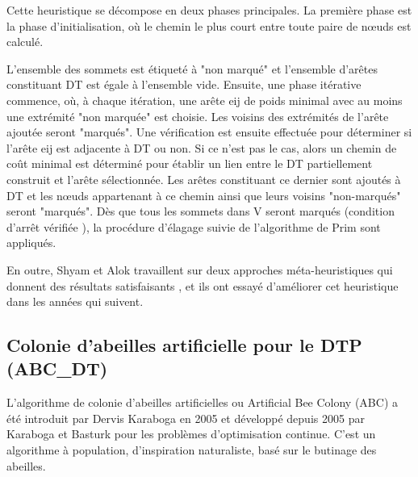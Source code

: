 Cette heuristique se décompose en deux phases principales. La première phase est la phase d’initialisation, où le chemin le plus court entre toute paire de nœuds est calculé.

L’ensemble des sommets est étiqueté à "non marqué" et l’ensemble d’arêtes constituant DT est égale à l’ensemble vide. Ensuite, une phase itérative commence, où, à chaque itération, une arête eij de poids minimal avec au moins une extrémité "non marquée" est choisie. Les voisins des extrémités de l’arête ajoutée seront "marqués". Une vérification est ensuite effectuée pour déterminer si l’arête eij est adjacente à DT ou non. Si ce n’est pas le cas, alors un chemin de coût minimal est déterminé pour établir un lien entre le DT partiellement construit et l’arête sélectionnée. Les arêtes constituant ce dernier sont ajoutés à DT et les nœuds appartenant à ce chemin ainsi que leurs voisins "non-marqués" seront "marqués". Dès que tous les sommets dans V seront marqués (condition d’arrêt vérifiée ), la procédure d’élagage suivie de l’algorithme de Prim  sont appliqués.   
    
En outre, Shyam et Alok travaillent sur deux approches méta-heuristiques qui donnent des résultats satisfaisants , et ils ont essayé d’améliorer cet heuristique dans les années qui suivent.

\subsection{Colonie d'abeilles artificielle pour le DTP (ABC\_DT)}
L’algorithme de colonie d’abeilles artificielles ou Artificial Bee Colony (ABC) a été introduit par Dervis Karaboga en 2005 \cite{karaboga2005idea} et développé depuis 2005 par Karaboga et Basturk \cite{karaboga2008performance} pour les problèmes d’optimisation continue. C’est un algorithme à population, d’inspiration naturaliste, basé sur le butinage des abeilles.\\


